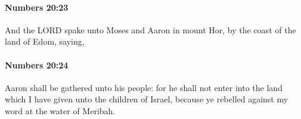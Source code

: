 		\paragraph{Numbers 20:23} %
			\label{NUMBERS-20-23}

			And the LORD spake unto Moses and Aaron in mount Hor, by the coast of the land of Edom, saying,


		\paragraph{Numbers 20:24} %
			\label{NUMBERS-20-24}

			Aaron shall be gathered unto his people: for he shall not enter into the land which I have given unto the children of Israel, because ye rebelled against my word at the water of Meribah.


